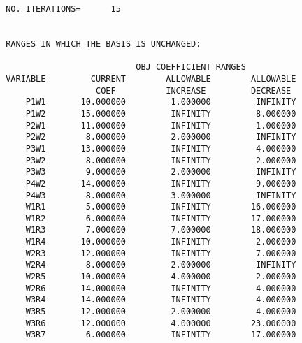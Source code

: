 \begin{verbatim}
 NO. ITERATIONS=      15


 RANGES IN WHICH THE BASIS IS UNCHANGED:

                           OBJ COEFFICIENT RANGES
 VARIABLE         CURRENT        ALLOWABLE        ALLOWABLE
                   COEF          INCREASE         DECREASE
     P1W1       10.000000         1.000000         INFINITY
     P1W2       15.000000         INFINITY         8.000000
     P2W1       11.000000         INFINITY         1.000000
     P2W2        8.000000         2.000000         INFINITY
     P3W1       13.000000         INFINITY         4.000000
     P3W2        8.000000         INFINITY         2.000000
     P3W3        9.000000         2.000000         INFINITY
     P4W2       14.000000         INFINITY         9.000000
     P4W3        8.000000         3.000000         INFINITY
     W1R1        5.000000         INFINITY        16.000000
     W1R2        6.000000         INFINITY        17.000000
     W1R3        7.000000         7.000000        18.000000
     W1R4       10.000000         INFINITY         2.000000
     W2R3       12.000000         INFINITY         7.000000
     W2R4        8.000000         2.000000         INFINITY
     W2R5       10.000000         4.000000         2.000000
     W2R6       14.000000         INFINITY         4.000000
     W3R4       14.000000         INFINITY         4.000000
     W3R5       12.000000         2.000000         4.000000
     W3R6       12.000000         4.000000        23.000000
     W3R7        6.000000         INFINITY        17.000000


\end{verbatim}
